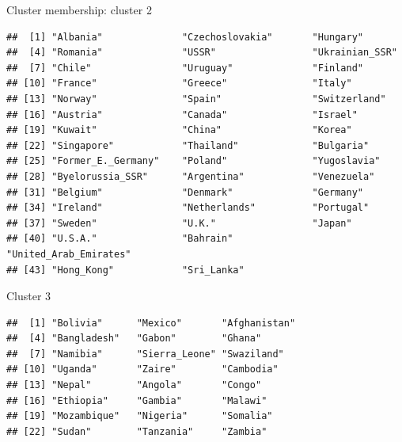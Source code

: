 \begin{frame}[fragile]{Cluster membership: cluster 2}


\begin{knitrout}\footnotesize
{}\color{fgcolor}\begin{kframe}
\begin{alltt}
\hlstd{(vital.s,country[cluster}\hlopt{==}\hlstd{])}
\end{alltt}
\begin{verbatim}
##  [1] "Albania"              "Czechoslovakia"       "Hungary"             
##  [4] "Romania"              "USSR"                 "Ukrainian_SSR"       
##  [7] "Chile"                "Uruguay"              "Finland"             
## [10] "France"               "Greece"               "Italy"               
## [13] "Norway"               "Spain"                "Switzerland"         
## [16] "Austria"              "Canada"               "Israel"              
## [19] "Kuwait"               "China"                "Korea"               
## [22] "Singapore"            "Thailand"             "Bulgaria"            
## [25] "Former_E._Germany"    "Poland"               "Yugoslavia"          
## [28] "Byelorussia_SSR"      "Argentina"            "Venezuela"           
## [31] "Belgium"              "Denmark"              "Germany"             
## [34] "Ireland"              "Netherlands"          "Portugal"            
## [37] "Sweden"               "U.K."                 "Japan"               
## [40] "U.S.A."               "Bahrain"              "United_Arab_Emirates"
## [43] "Hong_Kong"            "Sri_Lanka"
\end{verbatim}
\end{kframe}
\end{knitrout}

\end{frame}

\begin{frame}[fragile]{Cluster 3}
\begin{knitrout}\footnotesize
{}\color{fgcolor}\begin{kframe}
\begin{alltt}
\hlstd{(vital.s,country[cluster}\hlopt{==}\hlstd{])}
\end{alltt}
\begin{verbatim}
##  [1] "Bolivia"      "Mexico"       "Afghanistan" 
##  [4] "Bangladesh"   "Gabon"        "Ghana"       
##  [7] "Namibia"      "Sierra_Leone" "Swaziland"   
## [10] "Uganda"       "Zaire"        "Cambodia"    
## [13] "Nepal"        "Angola"       "Congo"       
## [16] "Ethiopia"     "Gambia"       "Malawi"      
## [19] "Mozambique"   "Nigeria"      "Somalia"     
## [22] "Sudan"        "Tanzania"     "Zambia"
\end{verbatim}
\end{kframe}
\end{knitrout}
\end{frame}

